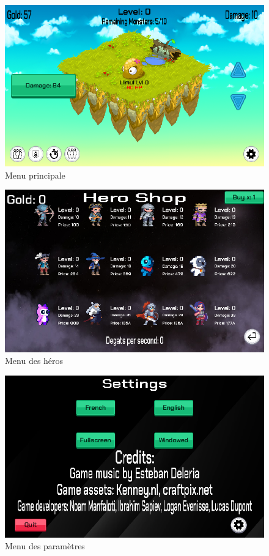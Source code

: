 \documentclass[11pt,a4paper]{article}
\begin{document}
\begin{figure}[h] 
    \centering 
    \includegraphics[width=12cm]{img/jeuPrincipale.png} 
    \caption{Menu principale}
\end{figure}
\begin{figure}[h] 
    \centering 
    \includegraphics[width=12cm]{img/MenuHeros.png} 
    \caption{Menu des héros}
\end{figure}
\begin{figure}[h] 
    \centering 
    \includegraphics[width=12cm]{img/Parametre.png} 
    \caption{Menu des paramètres}
\end{figure}
\end{document}
